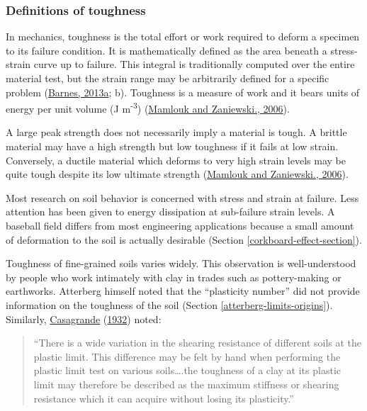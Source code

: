 \documentclass[
  letterpaper,
  openany]{book}
\renewenvironment{leftbar}{\def\FrameCommand{\color{grey30}\vrule width 1pt \hspace{10pt}}\MakeFramed {\advance\hsize-\width \FrameRestore}}{\endMakeFramed}
\renewenvironment{quote}%
{\begin{leftbar} \begin{quotation} \noindent \small }%
{\end{quotation}\end{leftbar}}
\begin{document}
\hypertarget{toughness-definitions}{%
\subsubsection{Definitions of toughness}\label{toughness-definitions}}

In mechanics, toughness is the total effort or work required to deform a specimen to its failure condition.
It is mathematically defined as the area beneath a stress-strain curve up to failure.
This integral is traditionally computed over the entire material test, but the strain range may be arbitrarily defined for a specific problem (\protect\hyperlink{ref-Barnes2013}{Barnes, 2013a}; b).
Toughness is a measure of work and it bears units of energy per unit volume (J m\textsuperscript{-3}) (\protect\hyperlink{ref-Mamlouk2006}{Mamlouk and Zaniewski., 2006}).

A large peak strength does not necessarily imply a material is tough.
A brittle material may have a high strength but low toughness if it fails at low strain.
Conversely, a ductile material which deforms to very high strain levels may be quite tough despite its low ultimate strength (\protect\hyperlink{ref-Mamlouk2006}{Mamlouk and Zaniewski., 2006}).

Most research on soil behavior is concerned with stress and strain at failure. Less attention has been given to energy dissipation at sub-failure strain levels.
A baseball field differs from most engineering applications because a small amount of deformation to the soil is actually desirable (Section \ref{corkboard-effect-section}).

Toughness of fine-grained soils varies widely.
This observation is well-understood by people who work intimately with clay in trades such as pottery-making or earthworks.
Atterberg himself noted that the ``plasticity number'' did not provide information on the toughness of the soil (Section \ref{atterberg-limits-origins}).
Similarly, \protect\hyperlink{ref-Casagrande1932}{Casagrande} (\protect\hyperlink{ref-Casagrande1932}{1932}) noted:

\begin{quote}
``There is a wide variation in the shearing resistance of different soils at the plastic limit. This difference may be felt by hand when performing the plastic limit test on various soils\ldots.the toughness of a clay at its plastic limit may therefore be described as the maximum stiffness or shearing resistance which it can acquire without losing its plasticity.''
\end{quote}
\end{document}
